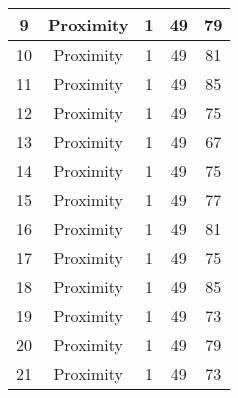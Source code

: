 \documentclass[results.tex]{subfiles}
\begin{document}
\begin{center}
\begin{tabular}{| c || c | c | c | c |}
            \hline
            9                       & Proximity                    & 1                      & 49                      & 79                   \\
            \hline
            10                      & Proximity                    & 1                      & 49                      & 81                   \\
            \hline
            11                      & Proximity                    & 1                      & 49                      & 85                   \\
            \hline
            12                      & Proximity                    & 1                      & 49                      & 75                   \\
            \hline
            13                      & Proximity                    & 1                      & 49                      & 67                   \\
            \hline
            14                      & Proximity                    & 1                      & 49                      & 75                   \\
            \hline
            15                      & Proximity                    & 1                      & 49                      & 77                   \\
            \hline
            16                      & Proximity                    & 1                      & 49                      & 81                   \\
            \hline
            17                      & Proximity                    & 1                      & 49                      & 75                   \\
            \hline
            18                      & Proximity                    & 1                      & 49                      & 85                   \\
            \hline
            19                      & Proximity                    & 1                      & 49                      & 73                   \\
            \hline
            20                      & Proximity                    & 1                      & 49                      & 79                   \\
            \hline
            21                      & Proximity                    & 1                      & 49                      & 73                   \\

\end{tabular}
\end{center}
\end{document}
